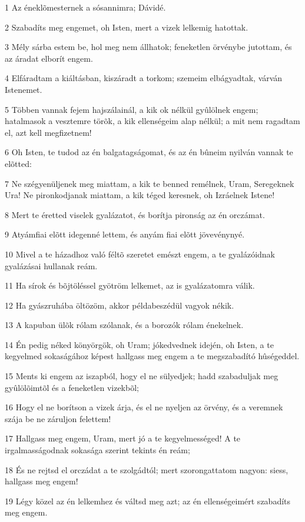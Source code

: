 \par 1 Az éneklõmesternek a sósannimra; Dávidé.
\par 2 Szabadíts meg engemet, oh Isten, mert a vizek lelkemig hatottak.
\par 3 Mély sárba estem be, hol meg nem állhatok; feneketlen örvénybe jutottam, és az áradat elborít engem.
\par 4 Elfáradtam a kiáltásban, kiszáradt a torkom; szemeim elbágyadtak, várván Istenemet.
\par 5 Többen vannak fejem hajszálainál, a kik ok nélkül gyûlölnek engem; hatalmasok a vesztemre törõk, a kik ellenségeim alap nélkül; a mit nem ragadtam el, azt kell megfizetnem!
\par 6 Oh Isten, te tudod az én balgatagságomat, és az én bûneim nyilván vannak te elõtted:
\par 7 Ne szégyenüljenek meg miattam, a kik te benned remélnek, Uram, Seregeknek Ura! Ne pironkodjanak miattam, a kik téged keresnek, oh Izráelnek Istene!
\par 8 Mert te éretted viselek gyalázatot, és borítja pironság az én orczámat.
\par 9 Atyámfiai elõtt idegenné lettem, és anyám fiai elõtt jövevénynyé.
\par 10 Mivel a te házadhoz való féltõ szeretet emészt engem, a te gyalázóidnak gyalázásai hullanak reám.
\par 11 Ha sírok és bõjtöléssel gyötröm lelkemet, az is gyalázatomra válik.
\par 12 Ha gyászruhába öltözöm, akkor példabeszédül vagyok nékik.
\par 13 A kapuban ülõk rólam szólanak, és a borozók rólam énekelnek.
\par 14 Én pedig néked könyörgök, oh Uram; jókedvednek idején, oh Isten, a te kegyelmed sokaságához képest hallgass meg engem a te megszabadító hûségeddel.
\par 15 Ments ki engem az iszapból, hogy el ne sülyedjek; hadd szabaduljak meg gyûlölõimtõl és a feneketlen vizekbõl;
\par 16 Hogy el ne borítson a vizek árja, és el ne nyeljen az örvény, és a veremnek szája be ne záruljon felettem!
\par 17 Hallgass meg engem, Uram, mert jó a te kegyelmességed! A te irgalmasságodnak sokasága szerint tekints én reám;
\par 18 És ne rejtsd el orczádat a te szolgádtól; mert szorongattatom nagyon: siess, hallgass meg engem!
\par 19 Légy közel az én lelkemhez és váltsd meg azt; az én ellenségeimért szabadíts meg engem.
